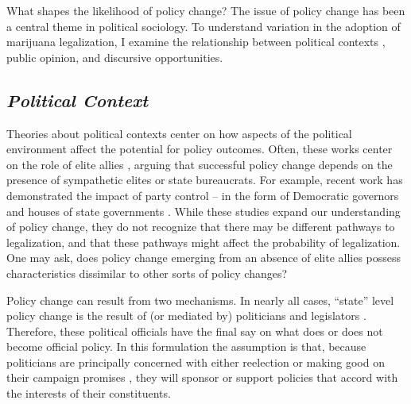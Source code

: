 What shapes the likelihood of policy change? The issue of policy change has been a central theme in political sociology. To understand variation in the adoption of marijuana legalization, I examine the relationship between political contexts%
, public opinion, and discursive opportunities.


\subsection{\it{Political Context}}

Theories about political contexts center on how aspects of the political environment affect the potential for policy outcomes. Often, these works center on the role of elite allies \citep{amenta_et_al_1994,amenta_2006}, arguing that successful policy change depends on the presence of sympathetic elites or state bureaucrats. For example, recent work has demonstrated the impact of party control -- in the form of Democratic governors and houses of state governments \citep{elliott_and_amenta_2019}. While these studies expand our understanding of policy change, they do not recognize that there may be different pathways to legalization, and that these pathways might affect the probability of legalization. One may ask, does policy change emerging from an absence of elite allies possess characteristics dissimilar to other sorts of policy changes? 




Policy change can result from two mechanisms. In nearly all cases, ``state'' level policy change is the result of (or mediated by) politicians and legislators \citep{amenta_et_al_1994,amenta_2006}. Therefore, these political officials have the final say on what does or does not become official policy. In this formulation the assumption is that, because politicians are principally concerned with either reelection or making good on their campaign promises \citep{elliott_and_amenta_2019,page_and_shapiro_1983,mayhew_1974,downs_1957,stimson_et_al_1995}, they will sponsor or support policies that accord with the interests of their constituents. 

